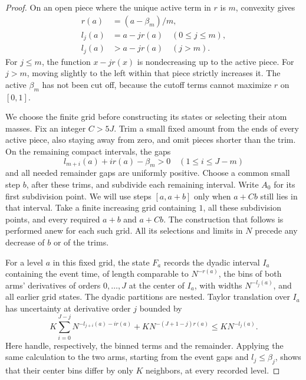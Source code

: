 \begin{proof}
On an open piece where the unique active term in \(r\) is \(m\),
convexity gives
\begin{align}
 r(a)&=(a-\beta_m)/m,\\
 l_j(a)&=a-jr(a)\quad(0\le j\le m),\\
 l_j(a)&>a-jr(a)\quad(j>m).
 \label{a02:active-piece}
\end{align}
For \(j\le m\), the function \(x-jr(x)\) is nondecreasing up to
the active piece.  For \(j>m\), moving slightly to the left within
that piece strictly increases it.  The active \(\beta_m\) has not
been cut off, because the cutoff terms cannot maximize \(r\) on
\([0,1]\).

We choose the finite grid before constructing its states or selecting
their atom masses.  Fix an integer \(C>5J\).  Trim a small fixed amount
from the ends of every active piece, also staying away from zero, and
omit pieces shorter than the trim.  On the remaining compact intervals,
the gaps
\[
 l_{m+i}(a)+i r(a)-\beta_m>0\quad(1\le i\le J-m)
\]
and all needed remainder gaps are uniformly positive.  Choose a common
small step \(b\), after these trims, and subdivide each remaining
interval.  Write \(A_0\) for its first subdivision point.  We will use
steps \([a,a+b]\) only when \(a+Cb\) still lies in that interval.
Take a finite increasing grid containing \(1\), all these subdivision
points, and every required \(a+b\) and \(a+Cb\).  The construction
that follows is performed anew for each such grid.  All its selections
and limits in \(N\) precede any decrease of \(b\) or of the trims.

For a level \(a\) in this fixed grid, the state \(F_a\) records the
dyadic interval \(I_a\) containing
the event time, of length comparable to \(N^{-r(a)}\), the bins of
both arms' derivatives of orders \(0,\ldots,J\) at the center of
\(I_a\), with widths \(N^{-l_j(a)}\), and all earlier grid states.
The dyadic partitions are nested.  Taylor translation over \(I_a\)
has uncertainty at derivative order \(j\) bounded by
\begin{equation}
 K\sum_{i=0}^{J-j}N^{-l_{j+i}(a)-ir(a)}
       +K N^{-(J+1-j)r(a)}
 \le K N^{-l_j(a)}.
 \label{a02:translated-bin-width}
\end{equation}
Here  handle,
respectively, the binned terms and the remainder.  Applying the same
calculation to the two arms, starting from the event gaps and
\(l_j\le\beta_j\), shows that their center bins differ by only \(K\)
neighbors, at every recorded level.


\end{proof}

